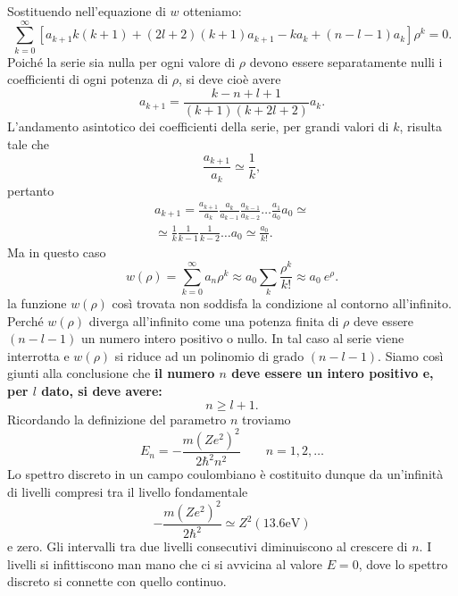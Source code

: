 \documentclass[a4paper,12pt,oneside]{book}
\begin{document}
Sostituendo nell'equazione di $w$ otteniamo:
\begin{equation}
\sum_{k=0}^\infty\left[a_{k+1}k\left(k+1\right)+\left(2l+2\right)\left(k+1\right)a_{k+1}-ka_k+\left(n-l-1\right)a_k\right]\rho^k=0 .
\end{equation}
Poiché la serie sia nulla per ogni valore di $\rho$ devono essere separatamente nulli i coefficienti di ogni potenza di $\rho$, si deve cioè avere
\begin{equation}
a_{k+1}=\frac{k-n+l+1}{\left(k+1\right)\left(k+2l+2\right)}a_k .
\end{equation}
L'andamento asintotico dei coefficienti della serie, per grandi valori di $k$, risulta tale che
\begin{equation}
\frac{a_{k+1}}{a_k}\simeq \frac{1}{k},
\end{equation}
pertanto
\begin{eqnarray}
a_{k+1}=\frac{a_{k+1}}{a_{k}}\frac{a_{k}}{a_{k-1}}\frac{a_{k-1}}{a_{k-2}}\dots \frac{a_{1}}{a_{0}}a_0 \simeq \nonumber \\
\simeq \frac{1}{k} \frac{1}{k-1}\frac{1}{k-2}\dots a_0\simeq \frac{a_0}{k!}  .
\end{eqnarray}
Ma in questo caso
\begin{equation}
w(\rho) =\sum _{k=0} ^{\infty} a_n\rho ^k \approx a_0 \sum _k \frac{\rho ^k}{k!} \approx a_0\ e^{\rho}.
\end{equation}
la funzione $w (\rho )$ così trovata non soddisfa la condizione al contorno all'infinito. Perché $w(\rho )$ diverga all'infinito come una potenza finita di $\rho$ deve essere $(n-l-1)$ un numero intero positivo o nullo. In tal caso al serie viene interrotta e $w (\rho )$ si riduce ad un polinomio di grado $(n-l-1)$. Siamo così giunti alla conclusione che \textbf{il numero $n$ deve essere un intero positivo e, per $l$ dato, si deve avere:}
\begin{equation}
n \geq l+1.
\end{equation}
Ricordando la definizione del parametro $n$ troviamo
\begin{equation}
E_n= -\frac{m\left(Ze^2\right) ^2}{2\hbar ^2 n^2}\qquad n=1,2,\dots
\end{equation}
Lo spettro discreto in un campo coulombiano è costituito dunque da un'infinità di livelli compresi tra il livello fondamentale
\begin{equation}
-\frac{m\left(Ze^2\right) ^2}{2\hbar ^2 }\simeq Z^2 \left(13.6 \textrm{eV}\right)
\end{equation}
e zero. Gli intervalli tra due livelli consecutivi diminuiscono al crescere di $n$. I livelli si infittiscono man mano che ci si avvicina al valore $E=0$, dove lo spettro discreto si connette con quello continuo.\\
\end{document}

